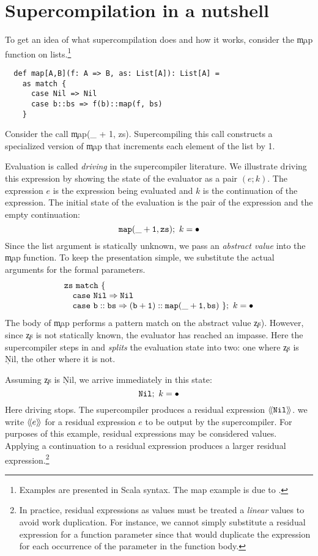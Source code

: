 \section{Supercompilation in a nutshell}
\label{sec:nutshell}

To get an idea of what supercompilation does and how it works, consider the
\c{map} function on lists.\footnote{Examples are presented in Scala syntax.
The map example is due to .}
\begin{verbatim}
  def map[A,B](f: A => B, as: List[A]): List[A] =
    as match {
      case Nil => Nil
      case b::bs => f(b)::map(f, bs)
    }
\end{verbatim}

Consider the call \c{map(_ + 1, zs)}.
Supercompiling this call constructs a specialized version of \c{map}
that increments each element of the list by 1.

Evaluation is called \emph{driving} in the supercompiler literature.
We illustrate driving this expression by showing the state of the evaluator
as a pair $(e; k)$. The expression $e$ is the expression being
evaluated and $k$ is the continuation of the expression.
The initial state of the evaluation is the pair of the expression and the
empty continuation:
  \[
    \c{map(\_+1, zs)};~k = \bullet
  \]
Since the list argument is statically unknown, 
we pass an \emph{abstract value} into the 
\c{map} function.
To keep the presentation simple, we substitute the actual arguments for the
formal parameters.
  \[
    \begin{array}{l}
      \c{zs~match~\{} \\ 
    \c{~~~case~Nil \Rightarrow Nil}  \\
      \c{~~~case~b::bs \Rightarrow  (b+1)::map(\_+1, bs)~\}};~k = \bullet
  \end{array}
  \]
The body of \c{map}
performs a pattern match on the abstract value \c{zs}).
However, since \c{zs} is not statically known, the evaluator has reached an impasse.
Here the supercompiler steps in and 
\emph{splits} the evaluation state into two: one where \c{zs} is \c{Nil}, the
other where it is not.

Assuming \c{zs} is \c{Nil}, we arrive immediately in this state:
    \[
      \c{Nil};~k = \bullet
    \]
Here driving stops.
The supercompiler produces a residual expression $\R{\c{Nil}}$.
we write
$\langle\!\langle e\rangle\!\rangle$ for a residual expression $e$ to be output 
by the supercompiler. For purposes of
this example, residual expressions may be considered values.
Applying a continuation to a residual expression produces a larger residual
expression.\footnote{In
practice, residual expressions as values
must be treated a \emph{linear} values to avoid work duplication.
For instance, we cannot simply substitute a residual expression
for a function parameter since that would duplicate the expression
for each occurrence of the parameter in the function body.}

